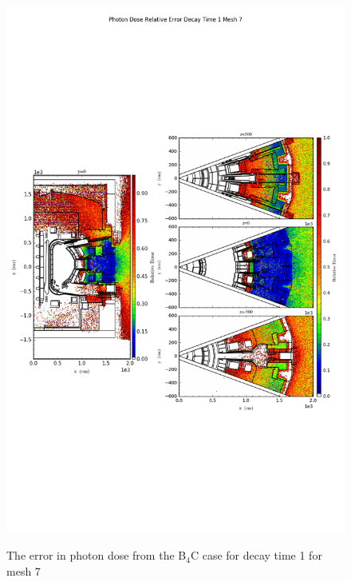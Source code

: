 \begin{figure}[ht!]
\centering
\includegraphics[trim={0cm 9cm 0cm 10cm},clip,scale=0.75]{../plots/final_model_with_b4c/Photon_Dose_Relative_Error_Decay_Time_1_Mesh_7.png}
\label{fig:photons_dc1_no4bc_m7_error}
\caption{The error in photon dose from the B$_4$C case for decay time 1 for mesh 7}
\end{figure}
